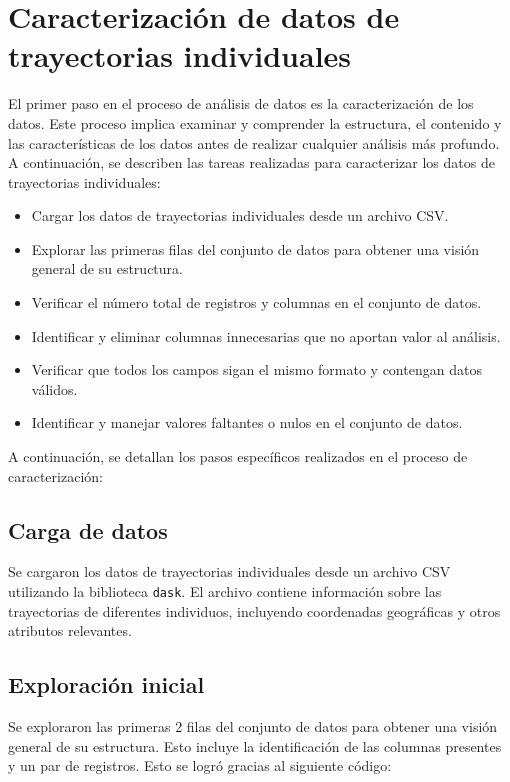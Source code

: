 \section{Caracterización de datos de trayectorias individuales}

\noindent El primer paso en el proceso de análisis de datos es la caracterización de los datos. Este proceso implica examinar y comprender la estructura, el contenido y las características de los datos antes de realizar cualquier análisis más profundo. A continuación, se describen las tareas realizadas para caracterizar los datos de trayectorias individuales:
\begin{itemize}
    \item Cargar los datos de trayectorias individuales desde un archivo CSV.
    \item Explorar las primeras filas del conjunto de datos para obtener una visión general de su estructura.
    \item Verificar el número total de registros y columnas en el conjunto de datos.
    \item Identificar y eliminar columnas innecesarias que no aportan valor al análisis.
    \item Verificar que todos los campos sigan el mismo formato y contengan datos válidos.
    \item Identificar y manejar valores faltantes o nulos en el conjunto de datos.

\end{itemize}
\noindent A continuación, se detallan los pasos específicos realizados en el proceso de caracterización:

\subsection{Carga de datos}
\noindent Se cargaron los datos de trayectorias individuales desde un archivo CSV utilizando la biblioteca \texttt{dask}. El archivo contiene información sobre las trayectorias de diferentes individuos, incluyendo coordenadas geográficas y otros atributos relevantes. 

\newpage
\subsection{Exploración inicial}
\noindent Se exploraron las primeras 2 filas del conjunto de datos para obtener una visión general de su estructura. Esto incluye la identificación de las columnas presentes y un par de registros. Esto se logró gracias al siguiente código:

